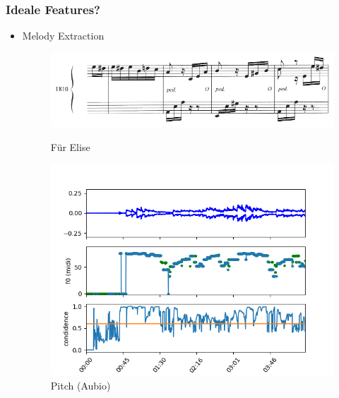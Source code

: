 \documentclass[12pt]{FSUBeamer_official}
\begin{document}
\begin{frame}
	\frametitle{Ideale Features?}
	\begin{itemize}
		\item Melody Extraction
		\begin{figure}[ht]
			\begin{minipage}[b]{0.45\linewidth}
				\centering
				\includegraphics[width=\textwidth]{pics/Notes/felise.png}
				\caption{Für Elise~\cite{fe1}}
				\label{fe}
			\end{minipage}
			\hspace{0.5cm}
			\begin{minipage}[b]{0.45\linewidth}
				\centering
				\includegraphics[width=\textwidth]{pics/Notes/feliseaubio.png}
				\caption{Pitch (Aubio)}
				\label{fep}
			\end{minipage}
		\end{figure}
	\end{itemize}
\end{frame}
\end{document}
